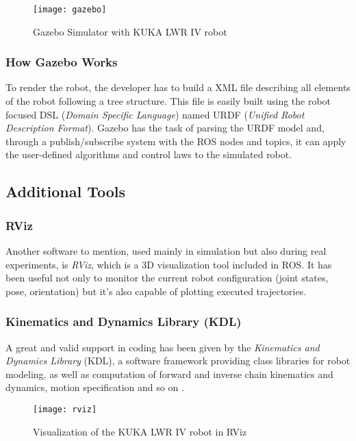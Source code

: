 \begin{figure}[H]
\centering
\texttt{[image: gazebo]} 
\caption{Gazebo Simulator with KUKA LWR IV robot}
\end{figure}


\subsubsection{How Gazebo Works}
To render the robot, the developer has to build a XML file describing all elements of the robot following a tree structure. This file is easily built using the robot focused DSL (\textit{Domain Specific Language}) named URDF (\textit{Unified Robot Description Format}). Gazebo has the task of parsing the URDF model and, through a publish/subscribe system with the ROS nodes and topics, it can apply the user-defined algorithms and control laws to the simulated robot.

\subsection{Additional Tools}
\subsubsection{RViz}
Another software to mention, used mainly in simulation but also during real experiments, is \textit{RViz}, which is a 3D visualization tool included in ROS. It has been useful not only to monitor the current robot configuration (joint states, pose, orientation) but it's also capable of plotting executed trajectories.

\subsubsection{Kinematics and Dynamics Library (KDL)}
A great and valid support in coding has been given by the \textit{Kinematics and Dynamics Library} (KDL), a software framework providing class libraries for robot modeling, as well as computation of forward and inverse chain kinematics and dynamics, motion specification and so on \cite{webkdl}.

\begin{figure}[H]
\centering
\texttt{[image: rviz]} 
\caption{Visualization of the KUKA LWR IV robot in RViz}
\end{figure}


\newpage